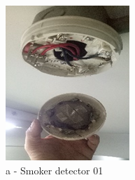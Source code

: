 \begin{table}[!h]
{	}
\end{table}



\begin{figure}[h]

	\begin{minipage}[b]{0.22\linewidth}
		\centering
		\includegraphics[width=\textwidth]{figures/ch05_fdas_sd01}
		\caption*{a - Smoker detector 01}
	\end{minipage}
	\hspace{0.03cm}
	\begin{minipage}[b]{0.22\linewidth}
		\centering

\end{minipage}
\end{figure}
